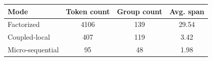 \begin{tabular}{lccc}
\toprule
Mode & Token count & Group count & Avg. span\\
\midrule
Factorized & 4106 & 139 & 29.54\\
Coupled-local & 407 & 119 & 3.42\\
Micro-sequential & 95 & 48 & 1.98\\
\bottomrule
\end{tabular}
